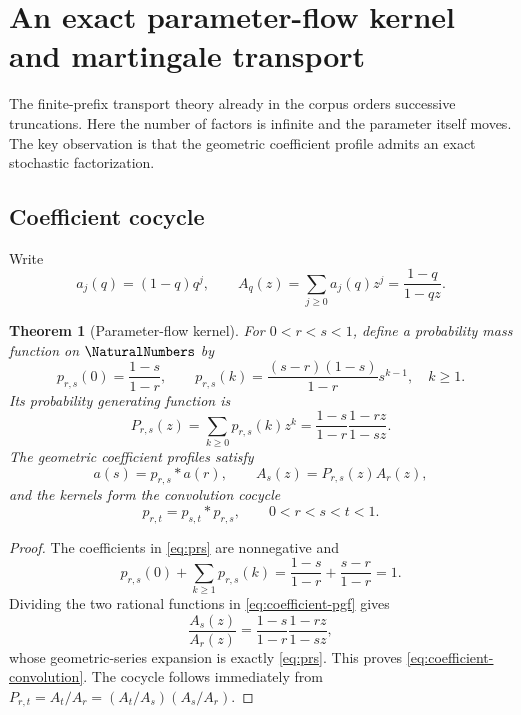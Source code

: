 \documentclass[11pt,a4paper]{article}
\newtheorem{theorem}{Theorem}[section]
\theoremstyle{definition}
\begin{document}
\section{An exact parameter-flow kernel and martingale transport}
\label{sec:transport}

The finite-prefix transport theory already in the corpus orders successive
truncations.  Here the number of factors is infinite and the parameter itself
moves.  The key observation is that the geometric coefficient profile admits
an exact stochastic factorization.

\subsection{Coefficient cocycle}

Write
\begin{equation}
 a_j(q)=(1-q)q^j,
 \qquad
 A_q(z)=\sum_{j\ge0}a_j(q)z^j=\frac{1-q}{1-qz}.
 \label{eq:coefficient-pgf}
\end{equation}

\begin{theorem}[Parameter-flow kernel]
\label{thm:kernel}
For $0<r<s<1$, define a probability mass function on $\NaturalNumbers$ by
\begin{equation}
 p_{r,s}(0)=\frac{1-s}{1-r},\qquad
 p_{r,s}(k)=\frac{(s-r)(1-s)}{1-r}s^{k-1},\quad k\ge1.
 \label{eq:prs}
\end{equation}
Its probability generating function is
\begin{equation}
 P_{r,s}(z)=\sum_{k\ge0}p_{r,s}(k)z^k
 =\frac{1-s}{1-r}\frac{1-rz}{1-sz}.
 \label{eq:Prs}
\end{equation}
The geometric coefficient profiles satisfy
\begin{equation}
 a(s)=p_{r,s}*a(r),
 \qquad A_s(z)=P_{r,s}(z)A_r(z),
 \label{eq:coefficient-convolution}
\end{equation}
and the kernels form the convolution cocycle
\begin{equation}
 p_{r,t}=p_{s,t}*p_{r,s},
 \qquad 0<r<s<t<1.
 \label{eq:cocycle}
\end{equation}
\end{theorem}

\begin{proof}
The coefficients in \eqref{eq:prs} are nonnegative and
\[
 p_{r,s}(0)+\sum_{k\ge1}p_{r,s}(k)
 =\frac{1-s}{1-r}+\frac{s-r}{1-r}=1.
\]
Dividing the two rational functions in \eqref{eq:coefficient-pgf} gives
\[
 \frac{A_s(z)}{A_r(z)}
 =\frac{1-s}{1-r}\frac{1-rz}{1-sz},
\]
whose geometric-series expansion is exactly \eqref{eq:prs}.  This proves
\eqref{eq:coefficient-convolution}.  The cocycle follows immediately from
$P_{r,t}=A_t/A_r=(A_t/A_s)(A_s/A_r)$.
\end{proof}
\end{document}
